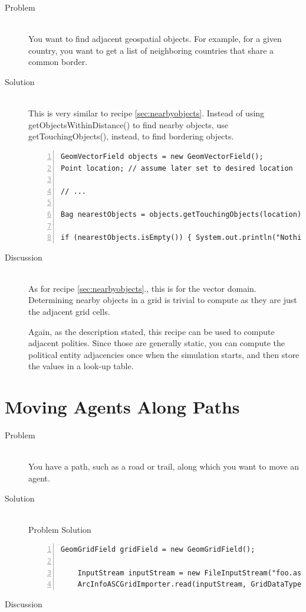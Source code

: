 \documentclass[twoside,10pt]{book}
\newcommand\method[1]{\textsf{#1}}
\begin{document}
\begin{description}
\item[Problem]~\\
You want to find adjacent geospatial objects. For example, for a given
country, you want to get a list of neighboring countries that share a
common border.

\item[Solution]~\\
This is very similar to recipe \ref{sec:nearbyobjects}.  Instead of
using \method{getObjectsWithinDistance()}  to find nearby objects, use
\method{getTouchingObjects()}, instead, to find bordering objects.
\begin{Verbatim}[frame=lines,framesep=5mm,numbers=left,commandchars=+\[\]]
GeomVectorField objects = new GeomVectorField();
Point location; // assume later set to desired location

// ...
	
Bag nearestObjects = objects.getTouchingObjects(location);

if (nearestObjects.isEmpty()) { System.out.println("Nothing nearby"); }
\end{Verbatim}

\item[Discussion]~\\
  As for recipe \ref{sec:nearbyobjects}., this is for the vector
  domain.  Determining nearby objects in a grid is trivial to compute
  as they are just the adjacent grid cells.

  Again, as the description stated, this recipe can be used to compute
  adjacent polities.  Since those are generally static, you can
  compute the political entity adjacencies once when the simulation
  starts, and then store the values in a look-up table.
\end{description}


\section{Moving Agents Along Paths}
\label{sec:movingalongpaths}

\begin{description}
\item[Problem]~\\
You have a path, such as a road or trail, along which you want to move
an agent.

\item[Solution]~\\
Problem Solution
\begin{Verbatim}[frame=lines,framesep=5mm,numbers=left,commandchars=+\[\]]
	GeomGridField gridField = new GeomGridField();
	
	InputStream inputStream = new FileInputStream("foo.asc");
	ArcInfoASCGridImporter.read(inputStream, GridDataType.INTEGER, gridField);
\end{Verbatim}

\item[Discussion ]
\end{description}
\end{document}
